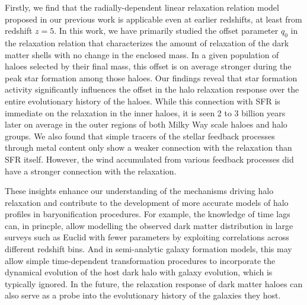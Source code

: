 Firstly, we find that the radially-dependent linear relaxation relation model proposed in our previous work is applicable even at earlier redshifts, at least from redshift $z=5$. In this work, we have primarily studied the offset parameter $q_0$ in the relaxation relation that characterizes the amount of relaxation of the dark matter shells with no change in the enclosed mass. In a given population of haloes selected by their final mass, this offset is on average stronger during the peak star formation among those haloes. 
Our findings reveal that star formation activity significantly influences the offset in the halo relaxation response  over the entire evolutionary history of the haloes. While this connection with SFR is immediate on the relaxation in the inner haloes, it is seen 2 to 3 billion years later on average in the outer regions of both Milky Way scale haloes and halo groups. %
%
We also found that simple tracers of the stellar feedback processes through metal content only show a weaker connection with the relaxation than SFR itself. However, the wind accumulated from various feedback processes did have a stronger connection with the relaxation.%

These insights enhance our understanding of the mechanisms driving halo relaxation and contribute to the development of more accurate models of halo profiles in baryonification procedures. 
For example, the knowledge of time lags can, in princple, allow modelling the observed dark matter distribution in large surveys such as Euclid with fewer parameters by exploiting correlations across different redshift bins.
And in semi-analytic galaxy formation models, this %
may allow simple time-dependent transformation procedures to incorporate the dynamical evolution of the host dark halo with galaxy evolution, which is typically ignored. In the future, the relaxation response of dark matter haloes can also serve as a probe into the evolutionary history of the galaxies they host.






